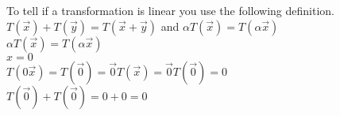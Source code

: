 To tell if a transformation is linear you use the following definition. $T(\Vec{x})+T(\Vec{y})=T(\Vec{x}+\Vec{y})$ and $\alpha T(\Vec{x})=T(\alpha\Vec{x})$
\\
$\alpha T(\Vec{x}) = T(\alpha\Vec{x})$
\\
$x=0$
\\
$T(0\Vec{x})= T(\Vec{0})=\Vec{0}T(\Vec{x})=\Vec{0}T(\Vec{0})=0$
\\
$T(\Vec{0})+T(\Vec{0})=0+0=0$
